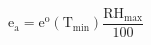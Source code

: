 \documentclass[12pt]{article}
\begin{document}
\begin{displaymath}
\mathrm{e}_{\mathrm{a}}=\mathrm{e}^{\mathrm{o}}\left(\mathrm{T}_{\mathrm{min}}\right) \frac{\mathrm{RH}_{\mathrm{max}}}{100}
\end{displaymath}
\end{document}

